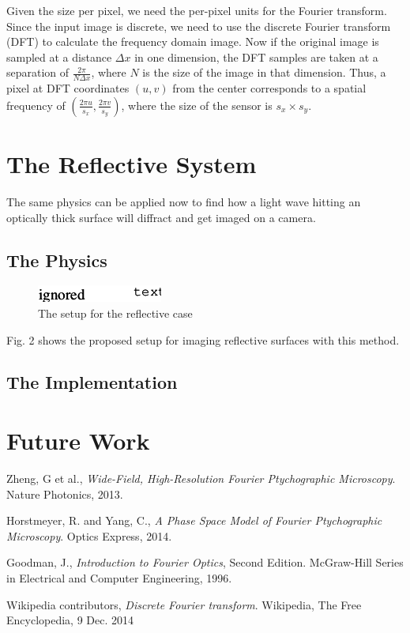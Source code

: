 \documentclass[11pt,a4paper,journal]{IEEEtran}
\begin{document}
Given the size per pixel, we need the per-pixel units for the Fourier transform. Since the input image is discrete, we need to use the discrete Fourier transform (DFT) to calculate the frequency domain image.  Now if the original image is sampled at a distance $\Delta x$ in one dimension, the DFT samples are taken at a separation of $\frac{2\pi}{N\Delta x}$\cite{DFTWiki}, where $N$ is the size of the image in that dimension. Thus, a pixel at DFT coordinates $(u, v)$ from the center corresponds to a spatial frequency of $\left(\frac{2\pi u}{s_x}, \frac{2\pi v}{s_y}\right)$, where the size of the sensor is $s_x \times s_y$.

\section{The Reflective System}
The same physics can be applied now to find how a light wave hitting an optically thick surface will diffract and get imaged on a camera.

\subsection{The Physics}
\begin{figure}
  \caption{The setup for the reflective case}
  \centering
    \includegraphics[scale=1]{fpm_setup_refl}
\end{figure}
Fig. 2 shows the proposed setup for imaging reflective surfaces with this method.

\subsection{The Implementation}

\section{Future Work}

\begin{thebibliography}{10}

  Zheng, G et al.,
  \emph{Wide-Field, High-Resolution Fourier Ptychographic Microscopy}.
  Nature Photonics,
  2013.
  
  Horstmeyer, R. and Yang, C.,
  \emph{A Phase Space Model of Fourier Ptychographic Microscopy}.
  Optics Express,
  2014.
  
  Goodman, J.,
  \emph{Introduction to Fourier Optics}, Second Edition.
  McGraw-Hill Series in Electrical and Computer Engineering,
  1996.

  Wikipedia contributors,
  \emph{Discrete Fourier transform}.
  Wikipedia, The Free Encyclopedia,
  9 Dec. 2014
  
\end{thebibliography}
\end{document}
